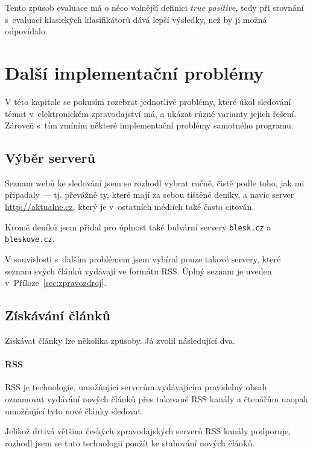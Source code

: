 \documentclass[12pt,a4paper]{report}
\begin{document}
Tento způsob evaluace má o něco volnější definici \emph{true positive}, tedy při srovnání s~evaluací klasických klasifikátorů dává lepší výsledky, než by jí možná odpovídalo.



\chapter{Další implementační problémy}
V této kapitole se pokusím rozebrat jednotlivé problémy, které úkol sledování témat v~elektronickém zpravodajství má, a ukázat různé varianty jejich řešení. Zároveň s~tím zmíním některé implementační problémy samotného programu.

\section{Výběr serverů}
Seznam webů ke sledování jsem se rozhodl vybrat ručně, čistě podle toho, jak  mi připadaly --- tj. převážně ty, které mají za sebou tištěné deníky, a navíc server \url{http://aktualne.cz}, který je v~ostatních médiích také často citován. 

Kromě  deníků jsem přidal pro úplnost také bulvární servery \texttt{blesk.cz} a \texttt{bleskove.cz}.

V souvislosti s~dalším problémem jsem vybíral pouze takové servery, které seznam svých článků vydávají ve formátu RSS. Úplný seznam je uveden v~Příloze~\ref{sec:zpravozdroj}.

\section{Získávání článků}
\label{sec:ziskavani}
Získávat články lze několika způsoby. Já zvolil následující dva.

\subsubsection{RSS}
RSS je technologie, umožňující serverům vydávajícím pravidelný obsah oznamovat vydávání nových článků přes takzvané RSS kanály a čtenářům naopak umožňující tyto nové články sledovat.

Jelikož drtivá většina českých zpravodajských serverů RSS kanály podporuje, rozhodl jsem se tuto technologii použít ke stahování nových článků.
\end{document}
